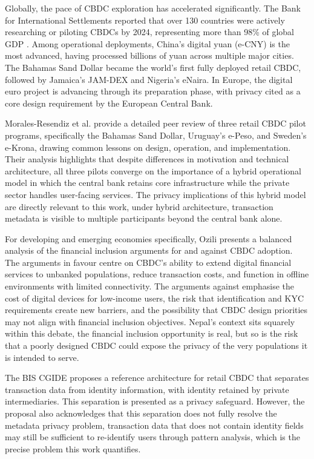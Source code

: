 Globally, the pace of CBDC exploration has accelerated
significantly. The Bank for International Settlements reported
that over 130 countries were actively researching or piloting
CBDCs by 2024, representing more than 98\% of global GDP
\cite{bis2020cbdc}. Among operational deployments, China's
digital yuan (e-CNY) is the most advanced, having processed
billions of yuan across multiple major cities. The Bahamas
Sand Dollar became the world's first fully deployed retail
CBDC, followed by Jamaica's JAM-DEX and Nigeria's eNaira.
In Europe, the digital euro project is advancing through
its preparation phase, with privacy cited as a core design
requirement by the European Central Bank.

Morales-Resendiz et al. \cite{moralesresendiz2021}
provide a detailed peer review of three retail CBDC pilot
programs, specifically the Bahamas Sand Dollar, Uruguay's e-Peso, and
Sweden's e-Krona, drawing common lessons on design,
operation, and implementation. Their analysis highlights that
despite differences in motivation and technical architecture,
all three pilots converge on the importance of a hybrid
operational model in which the central bank retains core
infrastructure while the private sector handles user-facing
services. The privacy implications of this hybrid model are
directly relevant to this work, under hybrid architecture,
transaction metadata is visible to multiple participants
beyond the central bank alone.

For developing and emerging economies specifically,
Ozili \cite{ozili2022} presents a balanced analysis of
the financial inclusion arguments for and against CBDC
adoption. The arguments in favour centre on CBDC's ability
to extend digital financial services to unbanked populations,
reduce transaction costs, and function in offline
environments with limited connectivity. The arguments against
emphasise the cost of digital devices for low-income users,
the risk that identification and KYC requirements create
new barriers, and the possibility that CBDC design priorities
may not align with financial inclusion objectives. Nepal's
context sits squarely within this debate, the financial
inclusion opportunity is real, but so is the risk that a
poorly designed CBDC could expose the privacy of the very
populations it is intended to serve.

The BIS CGIDE \cite{biscgide2024} proposes a reference
architecture for retail CBDC that separates transaction data
from identity information, with identity retained by private
intermediaries. This separation is presented as a privacy
safeguard. However, the proposal also acknowledges that this
separation does not fully resolve the metadata privacy
problem, transaction data that does not contain identity
fields may still be sufficient to re-identify users through
pattern analysis, which is the precise problem this work
quantifies.

